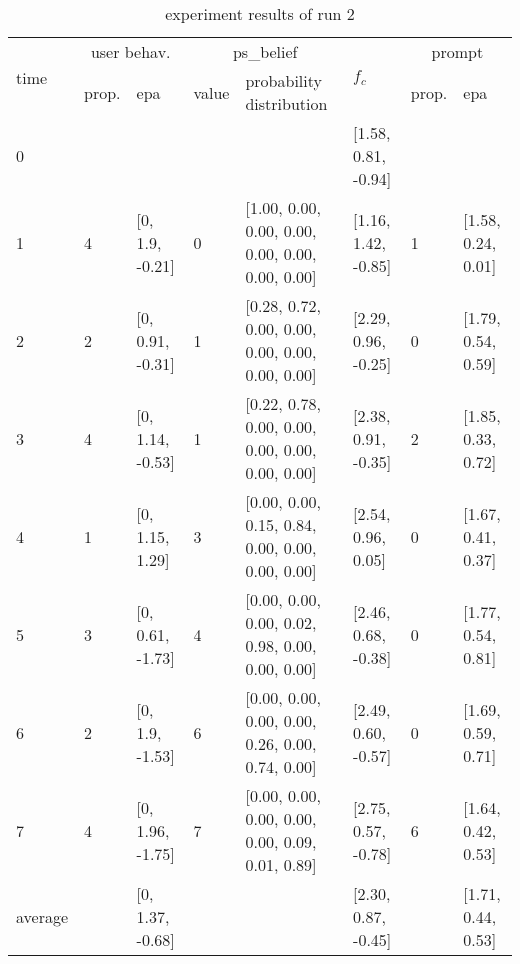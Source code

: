 \begin{table}[htbp]\footnotesize
\caption{experiment results of run 2}
\begin{center}
\begin{tabular}{|p{0.4cm}|p{0.6cm}|l|p{0.6cm}|p{3.3cm}|l|p{0.6cm}|l|}
\hline

\multirow{2}{*}{time} & \multicolumn{2}{c|}{user behav.} & \multicolumn{2}{c|}{ps\_belief} &
\multirow{2}{*}{$f_c$} & \multicolumn{2}{c|}{prompt} \\ \cline{2-5}\cline{ 7- 8}
& prop. & epa & value & probability distribution &  & prop. & epa \\ \hline

0 & \multicolumn{1}{l|}{} &  & \multicolumn{1}{l|}{} &  & [1.58, 0.81, -0.94] & \multicolumn{1}{l|}{} &  \\ \hline
1 & 4 & [0, 1.9, -0.21] & 0 & [1.00, 0.00, 0.00, 0.00, 0.00, 0.00, 0.00, 0.00] & [1.16, 1.42, -0.85] & 1 & [1.58, 0.24, 0.01] \\ \hline
2 & 2 & [0, 0.91, -0.31] & 1 & [0.28, 0.72, 0.00, 0.00, 0.00, 0.00, 0.00, 0.00] & [2.29, 0.96, -0.25] & 0 & [1.79, 0.54, 0.59] \\ \hline
3 & 4 & [0, 1.14, -0.53] & 1 & [0.22, 0.78, 0.00, 0.00, 0.00, 0.00, 0.00, 0.00] & [2.38, 0.91, -0.35] & 2 & [1.85, 0.33, 0.72] \\ \hline
4 & 1 & [0, 1.15, 1.29] & 3 & [0.00, 0.00, 0.15, 0.84, 0.00, 0.00, 0.00, 0.00] & [2.54, 0.96, 0.05] & 0 & [1.67, 0.41, 0.37] \\ \hline
5 & 3 & [0, 0.61, -1.73] & 4 & [0.00, 0.00, 0.00, 0.02, 0.98, 0.00, 0.00, 0.00] & [2.46, 0.68, -0.38] & 0 & [1.77, 0.54, 0.81] \\ \hline
6 & 2 & [0, 1.9, -1.53] & 6 & [0.00, 0.00, 0.00, 0.00, 0.26, 0.00, 0.74, 0.00] & [2.49, 0.60, -0.57] & 0 & [1.69, 0.59, 0.71] \\ \hline
7 & 4 & [0, 1.96, -1.75] & 7 & [0.00, 0.00, 0.00, 0.00, 0.00, 0.09, 0.01, 0.89] & [2.75, 0.57, -0.78] & 6 & [1.64, 0.42, 0.53] \\ \hline
\multicolumn{1}{|l|}{average} & \multicolumn{1}{l|}{} & [0, 1.37, -0.68] & \multicolumn{1}{l|}{} &  & [2.30, 0.87, -0.45] & \multicolumn{1}{l|}{} & [1.71, 0.44, 0.53] \\ \hline
\end{tabular}
\end{center}
\label{}
\end{table}


